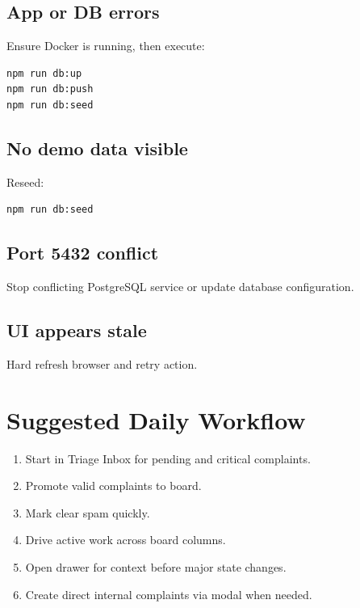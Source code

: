 \documentclass[11pt,a4paper]{article}
\begin{document}
\subsection*{App or DB errors}
Ensure Docker is running, then execute:
\begin{verbatim}
npm run db:up
npm run db:push
npm run db:seed
\end{verbatim}

\subsection*{No demo data visible}
Reseed:
\begin{verbatim}
npm run db:seed
\end{verbatim}

\subsection*{Port 5432 conflict}
Stop conflicting PostgreSQL service or update database configuration.

\subsection*{UI appears stale}
Hard refresh browser and retry action.

\section{Suggested Daily Workflow}
\begin{enumerate}
  \item Start in Triage Inbox for pending and critical complaints.
  \item Promote valid complaints to board.
  \item Mark clear spam quickly.
  \item Drive active work across board columns.
  \item Open drawer for context before major state changes.
  \item Create direct internal complaints via modal when needed.
\end{enumerate}
\end{document}
